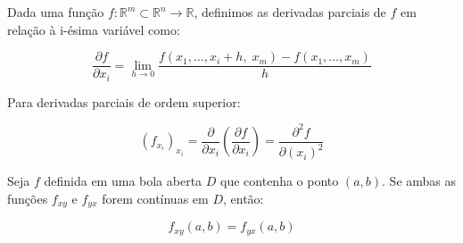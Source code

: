 \begin{definition} Dada uma função $f: \mathbb{R}^m \subset \mathbb{R}^n \to \mathbb{R}$, definimos as derivadas parciais de $f$ em relação à i-ésima variável como:

\[
\dfrac{\partial f} {\partial x_i} = \lim_{h \to 0} \dfrac{f(x_1, \dots,x_i + h , \; x_m) - f(x_1 ,\dots, x_m)}{h}
\]

\end{definition}

\begin{definition} Para derivadas parciais de ordem superior:

\[
(f_{x_i})_{x_i} = \dfrac{\partial}{\partial x_i} \left(\dfrac{\partial f} {\partial x_i} \right) = \dfrac{\partial^2f}{\partial (x_i)^2}
\]


\end{definition}

\begin{theorem}
Seja $f$ definida em uma bola aberta $D$ que contenha o ponto $(a, b)$. Se ambas as funções $f_{xy}$ e $f_{yx}$ forem contínuas em $D$, então:

\[
f_{xy}(a, b) = f_{yx}(a, b)
\]

\end{theorem}

